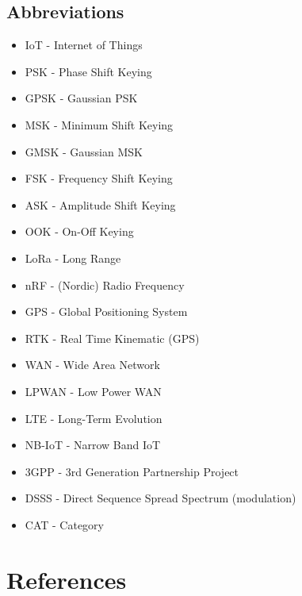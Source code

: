 \documentclass[draftclsnofoot,onecolumn, 10pt, compsoc]{IEEEtran}
\begin{document}
	\subsection{Abbreviations}
	\begin{itemize}
		\item IoT - Internet of Things
		\item PSK - Phase Shift Keying
		\item GPSK - Gaussian PSK
		\item MSK - Minimum Shift Keying
		\item GMSK - Gaussian MSK
		\item FSK - Frequency Shift Keying
		\item ASK - Amplitude Shift Keying
		\item OOK - On-Off Keying
		\item LoRa - Long Range
		\item nRF - (Nordic) Radio Frequency
		\item GPS - Global Positioning System
		\item RTK - Real Time Kinematic (GPS)
		\item WAN - Wide Area Network
		\item LPWAN - Low Power WAN
		\item LTE - Long-Term Evolution
		\item NB-IoT - Narrow Band IoT
		\item 3GPP - 3rd Generation Partnership Project
		\item DSSS - Direct Sequence Spread Spectrum (modulation)
		\item CAT - Category
	\end{itemize}

	
	\section{References}
	\nocite{*} %
	
\end{document}
